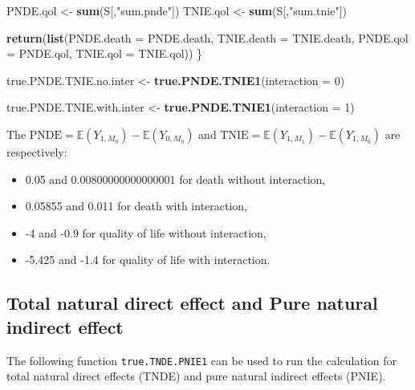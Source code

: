 \documentclass[
]{book}
\newenvironment{Shaded}{\begin{snugshade}}{\end{snugshade}}
\newcommand{\AttributeTok}[1]{\textcolor[rgb]{0.13,0.29,0.53}{#1}}
\newcommand{\DecValTok}[1]{\textcolor[rgb]{0.00,0.00,0.81}{#1}}
\newcommand{\FunctionTok}[1]{\textcolor[rgb]{0.13,0.29,0.53}{\textbf{#1}}}
\newcommand{\NormalTok}[1]{#1}
\newcommand{\OtherTok}[1]{\textcolor[rgb]{0.56,0.35,0.01}{#1}}
\newcommand{\StringTok}[1]{\textcolor[rgb]{0.31,0.60,0.02}{#1}}
\providecommand{\tightlist}{%
  \setlength{\itemsep}{0pt}\setlength{\parskip}{0pt}}
\begin{document}
\begin{Shaded}
\begin{Highlighting}[]
\NormalTok{  PNDE.qol }\OtherTok{\textless{}{-}} \FunctionTok{sum}\NormalTok{(S[,}\StringTok{"sum.pnde"}\NormalTok{])}
\NormalTok{  TNIE.qol }\OtherTok{\textless{}{-}} \FunctionTok{sum}\NormalTok{(S[,}\StringTok{"sum.tnie"}\NormalTok{])}
  
  \FunctionTok{return}\NormalTok{(}\FunctionTok{list}\NormalTok{(}\AttributeTok{PNDE.death =}\NormalTok{ PNDE.death, }\AttributeTok{TNIE.death =}\NormalTok{ TNIE.death, }
              \AttributeTok{PNDE.qol =}\NormalTok{ PNDE.qol, }\AttributeTok{TNIE.qol =}\NormalTok{ TNIE.qol))}
\NormalTok{\}}
\end{Highlighting}
\end{Shaded}

\begin{Shaded}
\begin{Highlighting}[]
\NormalTok{true.PNDE.TNIE.no.inter }\OtherTok{\textless{}{-}} \FunctionTok{true.PNDE.TNIE1}\NormalTok{(}\AttributeTok{interaction =} \DecValTok{0}\NormalTok{)}

\NormalTok{true.PNDE.TNIE.with.inter }\OtherTok{\textless{}{-}} \FunctionTok{true.PNDE.TNIE1}\NormalTok{(}\AttributeTok{interaction =} \DecValTok{1}\NormalTok{)}
\end{Highlighting}
\end{Shaded}

The \(\text{PNDE}=\mathbb{E}\left( Y_{1,M_0}\right) - \mathbb{E}\left(Y_{0,M_0}\right)\) and \(\text{TNIE}=\mathbb{E}\left( Y_{1,M_1}\right) - \mathbb{E}\left(Y_{1,M_0}\right)\) are respectively:

\begin{itemize}
\tightlist
\item
  0.05 and 0.00800000000000001 for death without interaction,
\item
  0.05855 and 0.011 for death with interaction,
\item
  -4 and -0.9 for quality of life without interaction,
\item
  -5.425 and -1.4 for quality of life with interaction.
\end{itemize}

\subsection{Total natural direct effect and Pure natural indirect effect}\label{total-natural-direct-effect-and-pure-natural-indirect-effect}

The following function \texttt{true.TNDE.PNIE1} can be used to run the calculation for total natural direct effects (TNDE) and pure natural indirect effects (PNIE).
\end{document}
